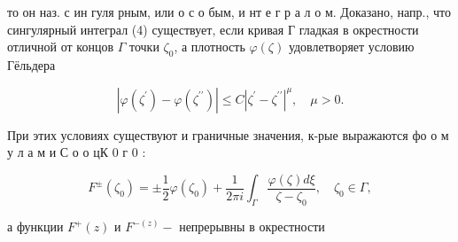 \documentclass[10pt]{article}
\begin{document}
то он наз. с ин гуля рным, или о с о бым, и нт е г р а л о м. Доказано, напр., что сингулярный интеграл (4) существует, если кривая Г гладкая в окрестности отличной от концов $\Gamma$ точки $\zeta_{0}$, а плотность $\varphi(\zeta)$ удовлетворяет условию Гёльдера



\[

\left|\varphi\left(\zeta^{\prime}\right)-\varphi\left(\zeta^{\prime \prime}\right)\right| \leqslant C\left|\zeta^{\prime}-\zeta^{\prime \prime}\right|^{\mu}, \quad \mu>0 .

\]



При этих условиях существуют и граничные значения, к-рые выражаются фо о м у л а м и С о о цК 0 г 0 :



\[

F^{ \pm}\left(\zeta_{0}\right)= \pm \frac{1}{2} \varphi\left(\zeta_{0}\right)+\frac{1}{2 \pi i} \int_{\Gamma} \frac{\varphi(\zeta) d \xi}{\zeta-\zeta_{0}}, \quad \zeta_{0} \in \Gamma,

\]



а функции $F^{+}(z)$ и $F^{-(z)}-$ непрерывны в окрестности
\end{document}
